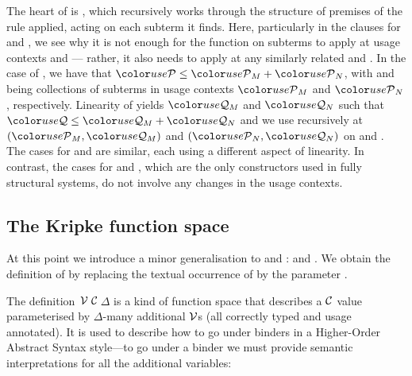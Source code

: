 The heart of  is , which recursively
works through the structure  of premises of the rule applied,
acting on each subterm it finds.
Here, particularly in the clauses for  and
, we see why it is not enough for the
function on subterms to apply at usage contexts  and 
--- rather, it also needs to apply at any similarly related 
and .
In the case of , we have that
$\grP \leq \grP_M + \grP_N$, with  and  being
collections of subterms in usage contexts $\grP_M$ and $\grP_N$, respectively.
Linearity of  yields $\grQ_M$ and $\grQ_N$ such that
$\grQ \leq \grQ_M + \grQ_N$ and we use  recursively at
$(\grP_M, \grQ_M)$ and $(\grP_N, \grQ_N)$ on  and .
The cases for  and
 are similar, each using a different aspect
of linearity.
In contrast, the cases for  and
, which are the only constructors used in fully structural
systems, do not involve any changes in the usage contexts.


\subsection{The Kripke function space}\label{sec:kripke}

At this point we introduce a minor generalisation to
 and :
\AgdaSpace{} and
\AgdaSpace{}.  We obtain the
definition of \AgdaSpace{} by
replacing the textual occurrence of  by the parameter
.

The definition \,$\mathcal V$\,$\mathcal C$\,$\Delta$ is a kind
of function space that describes a $\mathcal C$ value parameterised by
$\Delta$-many additional $\mathcal V$s (all correctly typed and usage
annotated). It is used to describe how to go under binders in a
Higher-Order Abstract Syntax style---to go under a binder we must
provide semantic interpretations for all the additional variables:


